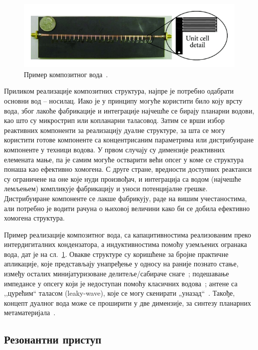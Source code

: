 \documentclass[main.tex]{subfiles}
\begin{document}
\begin{figure}[h]
    \centering
    \includegraphics[width=1.0\linewidth]{sl_uvod/crlh_kalo.jpg}
    \caption{Пример композитног вода~\cite{caloz2005}.}
    \label{uvod:crlh_kalo} 
\end{figure}
Приликом реализације композитних структура, најпре је потребно одабрати основни вод – носилац. Иако је у принципу могуће користити било коју врсту вода, због лакоће фабрикације и интеграције најчешће се бирају планарни водови, као што су микрострип или копланарни таласовод. Затим се врши избор реактивних компоненти за реализацију дуалне структуре, за шта се могу користити готове компоненте са концентрисаним параметрима или дистрибуиране компоненте у техници водова. У првом случају су димензије реактивних елемената мање, па је самим могуће остварити већи опсег у коме се структура понаша као ефективно хомогена. С друге стране, вредности доступних реактанси су ограничене на оне које нуди произвођач, и интеграција са водом (најчешће лемљењем) компликује фабрикацију и уноси потенцијалне грешке. Дистрибуиране компоненте се лакше фабрикују, раде на вишим учестаностима, али потребно је водити рачуна о њиховој величини како би се добила ефективно хомогена структура.

Пример реализације композитног вода, са капацитивностима реализованим преко интердигиталних кондензатора, а индуктивностима помоћу уземљених огранака вода, дат је на сл.~\ref{uvod:crlh_kalo}. Овакве структуре су коришћене за бројне практичне апликације, које представљају унапређење у односу на раније познато стање, између осталих минијатуризоване делитеље/сабираче снаге~\cite{caloz2004novel}; подешавање импедансе у опсегу који је недоступан помоћу класичних водова~\cite{damm2007electrically}; антене са ,,цурећим`` таласом (leaky-wave), које се могу скенирати „уназад“~\cite{roig2013liquid}. Такође, концепт дуалног вода може се проширити у две димензије, за синтезу планарних метаматеријала~\cite{grbic2004overcoming,798001}.

\subsection{Резонантни приступ}%
\end{document}
